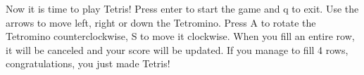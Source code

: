 \documentclass{article}
\begin{document}
Now it is time to play Tetris! Press enter to start the game and q to exit. Use the arrows to move left, right or down the Tetromino. Press A to rotate the Tetromino counterclockwise, S to move it clockwise.
When you fill an entire row, it will be canceled and your score will be updated.\newline
If you manage to fill 4 rows, congratulations, you just made Tetris!



\end{document}
